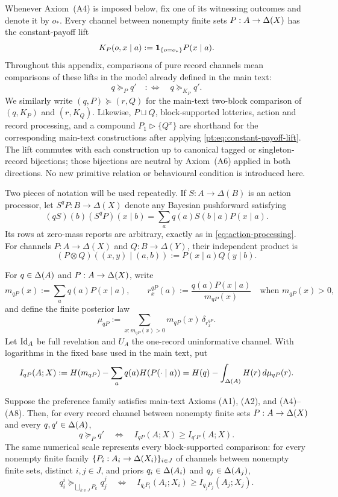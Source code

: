 Whenever Axiom~\textup{(A4)} is imposed below, fix one of its witnessing
outcomes and denote it by $o_\ast$.  Every channel between nonempty finite sets
$P:A\to\Delta(X)$ has the constant-payoff lift
\begin{equation}
K_P(o,x\mid a):=\mathbf 1_{\{o=o_\ast\}}P(x\mid a).
\label{pt:eq:constant-payoff-lift}
\end{equation}
Throughout this appendix, comparisons of pure record channels mean comparisons
of these lifts in the model already defined in the main text:
\[
q\succeq_Pq'\quad:\Longleftrightarrow\quad q\succeq_{K_P}q'.
\]
We similarly write $(q,P)\succeq(r,Q)$ for the main-text two-block
comparison of $(q,K_P)$ and $(r,K_Q)$.
Likewise, $P\sqcup Q$, block-supported lotteries, action and record
processing, and a compound $P_1\triangleright\{Q^x\}$ are shorthand for the
corresponding main-text constructions after applying
\eqref{pt:eq:constant-payoff-lift}.  The lift commutes with each construction
up to canonical tagged or singleton-record bijections; those bijections are
neutral by Axiom~\textup{(A6)} applied in both directions.  No new primitive
relation or behavioural condition is introduced here.

Two pieces of notation will be used repeatedly.  If
$S:A\to\Delta(B)$ is an action processor, let $S^qP:B\to\Delta(X)$ denote any
Bayesian pushforward satisfying
\[
 (qS)(b)(S^qP)(x\mid b)
 =\sum_a q(a)S(b\mid a)P(x\mid a).
\]
Its rows at zero-mass reports are arbitrary, exactly as in
\eqref{eq:action-processing}.  For channels $P:A\to\Delta(X)$ and
$Q:B\to\Delta(Y)$, their independent product is
\[
 (P\otimes Q)((x,y)\mid(a,b)):=P(x\mid a)Q(y\mid b).
\]

For $q\in\Delta(A)$ and $P:A\to\Delta(X)$, write
\[
m_{qP}(x):=\sum_a q(a)P(x\mid a),
\qquad
r_x^{qP}(a):=\frac{q(a)P(x\mid a)}{m_{qP}(x)}
\quad\text{when }m_{qP}(x)>0,
\]
and define the finite posterior law
\[
\mu_{qP}:=
\sum_{x:m_{qP}(x)>0}m_{qP}(x)\,\delta_{r_x^{qP}}.
\]
Let $\operatorname{Id}_A$ be full revelation and $U_A$ the one-record uninformative
channel.  With logarithms in the fixed base used in the main text, put
\[
I_{qP}(A;X)
:=H(m_{qP})-\sum_a q(a)H(P(\cdot\mid a))
=H(q)-\int_{\Delta(A)}H(r)\,d\mu_{qP}(r).
\]

\begin{proposition}\label{pt:prop:main}
Suppose the preference family satisfies main-text Axioms
\textup{(A1)}, \textup{(A2)}, and \textup{(A4)--(A8)}.  Then, for every record channel between
nonempty finite sets
$P:A\to\Delta(X)$ and every $q,q'\in\Delta(A)$,
\[
q\succeq_Pq'
\quad\Longleftrightarrow\quad
I_{qP}(A;X)\ge I_{q'P}(A;X).
\]
The same numerical scale represents every block-supported comparison: for
every nonempty finite family $\{P_i:A_i\to\Delta(X_i)\}_{i\in J}$ of channels
between nonempty finite sets, distinct $i,j\in J$,
and priors $q_i\in\Delta(A_i)$ and $q_j\in\Delta(A_j)$,
\[
q_i^i\succeq_{\bigsqcup_{k\in J}P_k}q_j^j
\quad\Longleftrightarrow\quad
I_{q_iP_i}(A_i;X_i)\ge I_{q_jP_j}(A_j;X_j).
\]
\end{proposition}

